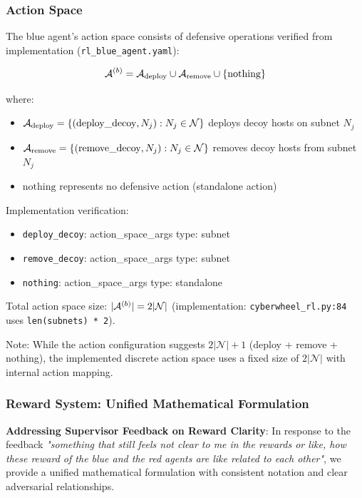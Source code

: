\documentclass[12pt,twoside]{article}
\begin{document}
\subsubsection{Action Space}
The blue agent's action space consists of defensive operations verified from implementation (\texttt{rl\_blue\_agent.yaml}):

\begin{equation}
\mathcal{A}^{(b)} = \mathcal{A}_{\text{deploy}} \cup \mathcal{A}_{\text{remove}} \cup \{\text{nothing}\}
\end{equation}

where:
\begin{itemize}
    \item $\mathcal{A}_{\text{deploy}} = \{(\text{deploy\_decoy}, N_j) : N_j \in \mathcal{N}\}$ deploys decoy hosts on subnet $N_j$
    \item $\mathcal{A}_{\text{remove}} = \{(\text{remove\_decoy}, N_j) : N_j \in \mathcal{N}\}$ removes decoy hosts from subnet $N_j$
    \item $\text{nothing}$ represents no defensive action (standalone action)
\end{itemize}

Implementation verification:
\begin{itemize}
    \item \texttt{deploy\_decoy}: action\_space\_args type: subnet
    \item \texttt{remove\_decoy}: action\_space\_args type: subnet  
    \item \texttt{nothing}: action\_space\_args type: standalone
\end{itemize}

Total action space size: $|\mathcal{A}^{(b)}| = 2|\mathcal{N}|$ (implementation: \texttt{cyberwheel\_rl.py:84} uses \texttt{len(subnets) * 2}).

Note: While the action configuration suggests $2|\mathcal{N}| + 1$ (deploy + remove + nothing), the implemented discrete action space uses a fixed size of $2|\mathcal{N}|$ with internal action mapping.

\subsubsection{Reward System: Unified Mathematical Formulation}

\textbf{Addressing Supervisor Feedback on Reward Clarity}: In response to the feedback \textit{"something that still feels not clear to me in the rewards or like, how these reward of the blue and the red agents are like related to each other"}, we provide a unified mathematical formulation with consistent notation and clear adversarial relationships.
\end{document}
